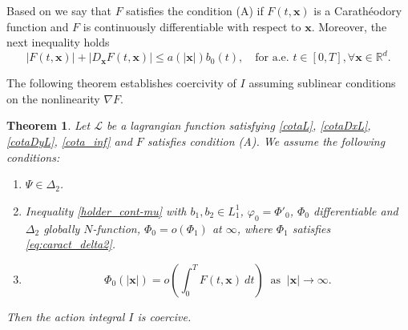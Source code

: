 \documentclass[twoside]{article}
\newtheorem{thm}{Theorem}[section]
\theoremstyle{remark}
\renewcommand{\b}[1]{\boldsymbol{#1}}
\newcommand{\rr}{\mathbb{R}}
\renewcommand{\leq}{\leqslant}
\begin{document}
Based on \cite{mawhin2010critical} we say that $F$ satisfies the condition (A) if  $F(t,\b{x})$ is a Carath\'eo\-dory function and  $F$ is continuously differentiable with respect to $\b{x}$. Moreover, the next inequality holds 
\begin{equation}\label{condA2}|F(t,\b{x})|+ |D_{\b{x}}F(t,\b{x})|\leq a(|\b{x}|)b_0(t),\quad\text{for a.e. }t\in [0,T], \forall\b{x}\in\rr^d.
\end{equation}

The following theorem establishes  coercivity of $I$ assuming sublinear conditions on the nonlinearity  $\nabla F$. 












\begin{thm}\label{coercitividad-r}
Let  $\mathcal{L}$ be a lagrangian function satisfying \eqref{cotaL}, \eqref{cotaDxL}, \eqref{cotaDyL}, \eqref{cota_inf}  and $F$ satisfies condition (A). We assume the following conditions:
\begin{enumerate}
\item $\Psi\in\Delta_2$.
\item Inequality \eqref{holder_cont-mu} with $b_1,b_2 \in L^1_1$,  $\varphi_0=\Phi'_0$, $\Phi_0$ differentiable and  $\Delta_2$ globally $N$-function, 
$\Phi_0=o(\Phi_1)$ at $\infty$, where $\Phi_1$ satisfies \eqref{eq:caract_delta2}.
\item 
\begin{equation}\label{propiedad-coercividad-sigma}
\Phi_0(|\b{x}|)=o\left(\int_{0}^{T}F(t,\b{x})\ dt\right)\;\;\mbox{as}\;\;|\b{x}|\to \infty.
\end{equation}
\end{enumerate}
Then  the action integral $I$ is coercive.
\end{thm}
\end{document}

